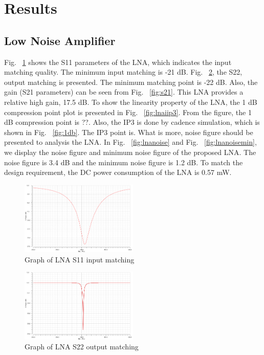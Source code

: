 \section{Results}
\subsection{Low Noise Amplifier}
Fig. ~\ref{fig:s11} shows the S11 parameters of the LNA, which indicates the input matching quality. The minimum input matching is -21 dB. Fig. ~\ref{fig:s22}, the S22, output matching is presented. The minimum matching point is -22 dB. Also, the gain (S21 parameters) can be seen from Fig. ~\ref{fig:s21}. This LNA provides a relative high gain, 17.5 dB. To show the linearity property of the LNA, the 1 dB compression point plot is presented in Fig. ~\ref{fig:lnaiip3}. From the figure, the 1 dB compression point is ??. Also, the IP3 is done by cadence simulation, which is shown in Fig. ~\ref{fig:1db}. The IP3 point is. What is more, noise figure should be presented to analysis the LNA. In Fig. ~\ref{fig:lnanoise} and Fig. ~\ref{fig:lnanoisemin}, we display the noise figure and minimum noise figure of the proposed LNA. The noise figure is 3.4 dB and the minimum noise figure is 1.2 dB. To match the design requirement, the DC power consumption of the LNA is 0.57 mW. 

\begin{figure}[h]
   \centering
    \includegraphics[width=0.5\textwidth]{figures/s11.png}
    \caption{Graph of LNA S11 input matching}
    \label{fig:s11}
\end{figure}

\begin{figure}[h]
   \centering
    \includegraphics[width=0.5\textwidth]{figures/s22.png}
    \caption{Graph of LNA S22 output matching}
    \label{fig:s22}
\end{figure}

